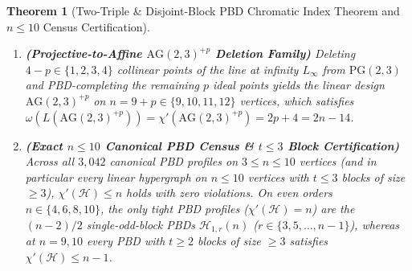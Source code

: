 \documentclass[11pt,reqno]{amsart}
\newtheorem{theorem}{Theorem}[section]
\theoremstyle{definition}
\theoremstyle{remark}
\begin{document}
\begin{theorem}[Two-Triple \& Disjoint-Block PBD Chromatic Index Theorem and $n \le 10$ Census Certification]
\begin{enumerate}
\begin{equation}
\begin{aligned}
    \end{aligned}
  \end{equation}
  \item[\textup{(iii)}] \textbf{(Projective-to-Affine $\mathrm{AG}(2,3)^{+p}$ Deletion Family)} Deleting $4 - p \in \{1, 2, 3, 4\}$ collinear points of the line at infinity $L_\infty$ from $\mathrm{PG}(2,3)$ and PBD-completing the remaining $p$ ideal points yields the linear design $\mathrm{AG}(2,3)^{+p}$ on $n = 9 + p \in \{9, 10, 11, 12\}$ vertices, which satisfies $\omega(L(\mathrm{AG}(2,3)^{+p})) = \chi'(\mathrm{AG}(2,3)^{+p}) = 2p + 4 = 2n - 14$.
  \item[\textup{(iv)}] \textbf{(Exact $n \le 10$ Canonical PBD Census \& $t \le 3$ Block Certification)} Across all $3{,}042$ canonical PBD profiles on $3 \le n \le 10$ vertices (and in particular every linear hypergraph on $n \le 10$ vertices with $t \le 3$ blocks of size $\ge 3$), $\chi'(\mathcal{H}) \le n$ holds with zero violations. On even orders $n \in \{4, 6, 8, 10\}$, the only tight PBD profiles ($\chi'(\mathcal{H}) = n$) are the $(n-2)/2$ single-odd-block PBDs $\mathcal{H}_{1,r}(n)$ ($r \in \{3, 5, \dots, n - 1\}$), whereas at $n = 9, 10$ every PBD with $t \ge 2$ blocks of size $\ge 3$ satisfies $\chi'(\mathcal{H}) \le n - 1$.
\end{enumerate}
\end{theorem}
\end{document}
